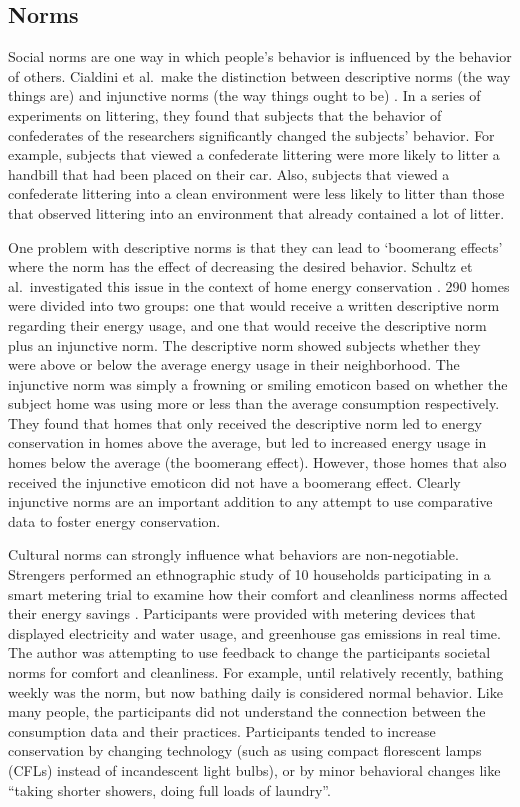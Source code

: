 \subsection{Norms}

Social norms are one way in which people's behavior is influenced by the behavior of others. Cialdini et al.\ make the distinction between descriptive norms (the way things are) and injunctive norms (the way things ought to be) \cite{Cialdini90}. In a series of experiments on littering, they found that subjects that the behavior of confederates of the researchers significantly changed the subjects' behavior. For example, subjects that viewed a confederate littering were more likely to litter a handbill that had been placed on their car. Also, subjects that viewed a confederate littering into a clean environment were less likely to litter than those that observed littering into an environment that already contained a lot of litter.

One problem with descriptive norms is that they can lead to `boomerang effects' where the norm has the effect of decreasing the desired behavior. Schultz et al.\ investigated this issue in the context of home energy conservation \cite{Schultz2007SocialNorms}. 290 homes were divided into two groups: one that would receive a written descriptive norm regarding their energy usage, and one that would receive the descriptive norm plus an injunctive norm. The descriptive norm showed subjects whether they were above or below the average energy usage in their neighborhood. The injunctive norm was simply a frowning or smiling emoticon based on whether the subject home was using more or less than the average consumption respectively. They found that homes that only received the descriptive norm led to energy conservation in homes above the average, but led to increased energy usage in homes below the average (the boomerang effect). However, those homes that also received the injunctive emoticon did not have a boomerang effect. Clearly injunctive norms are an important addition to any attempt to use comparative data to foster energy conservation.

Cultural norms can strongly influence what behaviors are non-negotiable. Strengers performed an ethnographic study of 10 households participating in a smart metering trial to examine how their comfort and cleanliness norms affected their energy savings \cite{strengers-comfort-norms-2008}. Participants were provided with metering devices that displayed electricity and water usage, and greenhouse gas emissions in real time. The author was attempting to use feedback to change the participants societal norms for comfort and cleanliness. For example, until relatively recently, bathing weekly was the norm, but now bathing daily is considered normal behavior. Like many people, the participants did not understand the connection between the consumption data and their practices. Participants tended to increase conservation by changing technology (such as using compact florescent lamps (CFLs) instead of incandescent light bulbs), or by minor behavioral changes like ``taking shorter showers, doing full loads of laundry''.

